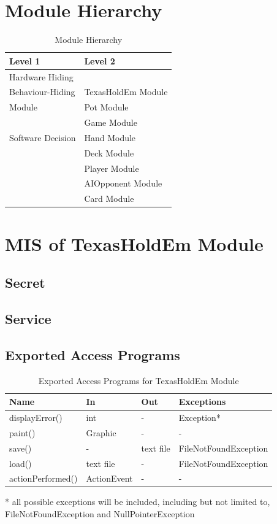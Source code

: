 \documentclass[11pt]{article}
\newcommand{\head}[1]{\textnormal{\textbf{#1}}}
\begin{document}
    \section{Module Hierarchy}
    \begin{table}[h]
    \caption{Module Hierarchy}
    \begin{tabular}{p{4cm}p{5cm}}
    \head{Level 1} & \head{Level 2} \\
    \hline
    Hardware Hiding & \\
    \hline
    Behaviour-Hiding  & TexasHoldEm Module \\
    Module & Pot Module\\
     & Game Module\\
    \hline
    Software Decision & Hand Module  \\
     & Deck Module\\
     & Player Module \\
     & AIOpponent Module\\
     & Card Module\\
    \hline
    \end{tabular}
    \end{table}
    
    \section{MIS of TexasHoldEm Module}
    \subsection{Secret}
    \subsection{Service}
    \subsection{Exported Access Programs}
    \begin{table}[h]
    \caption{Exported Access Programs for TexasHoldEm Module}
    \begin{tabular}{p{4cm}p{2cm}p{2cm}p{4cm}}
    Name & In & Out & Exceptions\\
    \hline
	displayError() & int & - & Exception*\\
	\hline
    paint() & Graphic & - & -\\
    \hline
    save() & - & text file & FileNotFoundException\\
    \hline
    load() & text file & - & FileNotFoundException\\
    \hline
    actionPerformed() & ActionEvent &  - & - \\
    \hline
    \end{tabular}
    * all possible exceptions will be included, including but not limited to, FileNotFoundException and NullPointerException
    \end{table}
    
\end{document}

